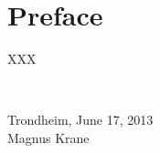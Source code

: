 \section*{Preface}

		XXX


\mbox{}\\[10pc]
\begin{center}
Trondheim, June 17, 2013\\[1pc]
\vspace{15 mm}
Magnus Krane
\end{center}

\clearpage
